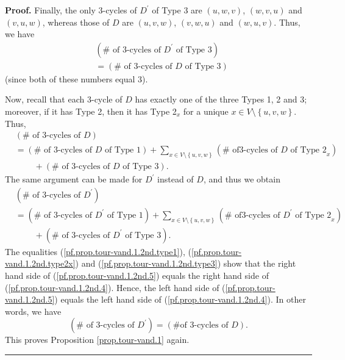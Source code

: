 \documentclass[numbers=enddot,12pt,final,onecolumn,notitlepage]{scrartcl}%
\numberwithin{exer}{subsection}
\theoremstyle{definition}
\newenvironment{proof}[1][Proof]{\noindent\textbf{#1.} }{\ \rule{0.5em}{0.5em}}
\let\sumnonlimits\sum
\renewcommand{\sum}{\sumnonlimits\limits}
\begin{document}
\begin{proof}
Finally, the only $3$-cycles of $D^{\prime}$ of Type 3 are $\left(
u,w,v\right)  $, $\left(  w,v,u\right)  $ and $\left(  v,u,w\right)  $,
whereas those of $D$ are $\left(  u,v,w\right)  $, $\left(  v,w,u\right)  $
and $\left(  w,u,v\right)  $. Thus, we have%
\begin{align}
&  \left(  \#\text{ of }3\text{-cycles of }D^{\prime}\text{ of Type 3}\right)
\nonumber\\
&  =\left(  \#\text{ of }3\text{-cycles of }D\text{ of Type 3}\right)
\label{pf.prop.tour-vand.1.2nd.type3}%
\end{align}
(since both of these numbers equal $3$).

Now, recall that each $3$-cycle of $D$ has exactly one of the three Types 1, 2
and 3; moreover, if it has Type 2, then it has Type 2$_{x}$ for a unique $x\in
V\setminus\left\{  u,v,w\right\}  $. Thus,%
\begin{align}
&  \left(  \#\text{ of }3\text{-cycles of }D\right) \nonumber\\
&  =\left(  \#\text{ of }3\text{-cycles of }D\text{ of Type 1}\right)
+\sum_{x\in V\setminus\left\{  u,v,w\right\}  }\left(  \#\text{ of
}3\text{-cycles of }D\text{ of Type 2}_{x}\right) \nonumber\\
&  \ \ \ \ \ \ \ \ \ \ +\left(  \#\text{ of }3\text{-cycles of }D\text{ of
Type 3}\right)  . \label{pf.prop.tour-vand.1.2nd.4}%
\end{align}
The same argument can be made for $D^{\prime}$ instead of $D$, and thus we
obtain%
\begin{align}
&  \left(  \#\text{ of }3\text{-cycles of }D^{\prime}\right) \nonumber\\
&  =\left(  \#\text{ of }3\text{-cycles of }D^{\prime}\text{ of Type
1}\right)  +\sum_{x\in V\setminus\left\{  u,v,w\right\}  }\left(  \#\text{ of
}3\text{-cycles of }D^{\prime}\text{ of Type 2}_{x}\right) \nonumber\\
&  \ \ \ \ \ \ \ \ \ \ +\left(  \#\text{ of }3\text{-cycles of }D^{\prime
}\text{ of Type 3}\right)  . \label{pf.prop.tour-vand.1.2nd.5}%
\end{align}
The equalities (\ref{pf.prop.tour-vand.1.2nd.type1}),
(\ref{pf.prop.tour-vand.1.2nd.type2x}) and
(\ref{pf.prop.tour-vand.1.2nd.type3}) show that the right hand side of
(\ref{pf.prop.tour-vand.1.2nd.5}) equals the right hand side of
(\ref{pf.prop.tour-vand.1.2nd.4}). Hence, the left hand side of
(\ref{pf.prop.tour-vand.1.2nd.5}) equals the left hand side of
(\ref{pf.prop.tour-vand.1.2nd.4}). In other words, we have%
\[
\left(  \#\text{ of }3\text{-cycles of }D^{\prime}\right)  =\left(  \#\text{
of }3\text{-cycles of }D\right)  .
\]
This proves Proposition \ref{prop.tour-vand.1} again.
\end{proof}
\end{document}
